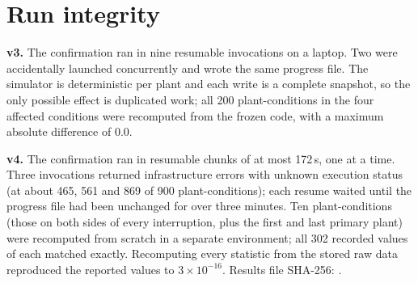 \documentclass[11pt]{article}
\begin{document}
\section{Run integrity}\label{app:integrity}
\textbf{v3.} The confirmation ran in nine resumable invocations on a laptop. Two were accidentally launched concurrently and wrote the same progress file. The simulator is deterministic per plant and each write is a complete snapshot, so the only possible effect is duplicated work; all 200 plant-conditions in the four affected conditions were recomputed from the frozen code, with a maximum absolute difference of 0.0.

\textbf{v4.} The confirmation ran in resumable chunks of at most 172\,s, one at a time. Three invocations returned infrastructure errors with unknown execution status (at about 465, 561 and 869 of 900 plant-conditions); each resume waited until the progress file had been unchanged for over three minutes. Ten plant-conditions (those on both sides of every interruption, plus the first and last primary plant) were recomputed from scratch in a separate environment; all 302 recorded values of each matched exactly. Recomputing every statistic from the stored raw data reproduced the reported values to $3\times10^{-16}$. Results file SHA-256: \texttt{}.
\end{document}
